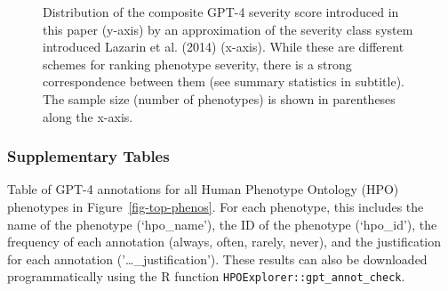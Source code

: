 \documentclass[
]{agujournal2019}
\begin{document}
\label{cell-fig-severity-class}
\begin{figure}[H]


\caption{\label{fig-severity-class}Distribution of the composite GPT-4
severity score introduced in this paper (y-axis) by an approximation of
the severity class system introduced Lazarin et al. (2014) (x-axis).
While these are different schemes for ranking phenotype severity, there
is a strong correspondence between them (see summary statistics in
subtitle). The sample size (number of phenotypes) is shown in
parentheses along the x-axis.}

\end{figure}%

\newpage{}

\subsubsection{Supplementary Tables}\label{supplementary-tables}

\begin{table}

\caption{\label{tbl-annotations}Table of GPT-4 annotations for all Human
Phenotype Ontology (HPO) phenotypes in Figure~\ref{fig-top-phenos}. For
each phenotype, this includes the name of the phenotype (`hpo\_name'),
the ID of the phenotype (`hpo\_id'), the frequency of each annotation
(always, often, rarely, never), and the justification for each
annotation ('\ldots\_justification'). These results can also be
downloaded programmatically using the R function
\texttt{HPOExplorer::gpt\_annot\_check}.}


\end{table}%
\end{document}
